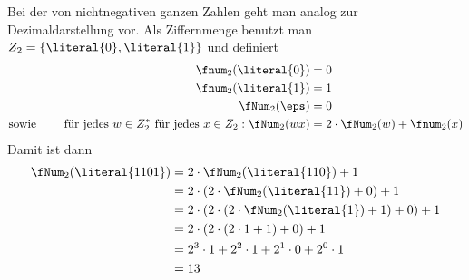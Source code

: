 \noindent
Bei der  von
nichtnegativen ganzen Zahlen geht man analog zur Dezimaldarstellung
vor. Als Ziffernmenge benutzt man $Z_2=\{\literal{0}, \literal{1}\}$
und definiert
\begin{align*}
   \fnum_2(\literal{0}) &= 0 \\
   \fnum_2(\literal{1}) &= 1 \\
   \fNum_2(\eps) &= 0 \\
\text{sowie \qquad }\text{für jedes }  w\in Z_2^* \,\, \text{für jedes }  x\in Z_2:  \fNum_2(wx) &= 2\cdot \fNum_2(w) +\fnum_2(x)
\end{align*}
%
Damit ist dann \zB 
%
\begin{align*}
  \fNum_2(\literal{1101}) &= 2\cdot  \fNum_2(\literal{110}) +1 \\
  &= 2\cdot (2\cdot  \fNum_2(\literal{11}) + 0) +1 \\
  & = 2 \cdot(2\cdot (2\cdot\fNum_2(\literal{1})+ 1)+0 ) +1 \\
  & = 2 \cdot(2\cdot (2\cdot1+ 1)+0 ) +1 \\
  & = 2^3\cdot 1 + 2^2 \cdot 1 + 2^1 \cdot 0 + 2^0 \cdot 1 \\
  & = 13
\end{align*}
%
